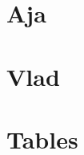 \documentclass[10pt]{article}
\numberwithin{figure}{section}
\begin{document}
\tableofcontents
\section{Aja}

\section{Vlad}

\section{Tables}


%






%

\end{document}
